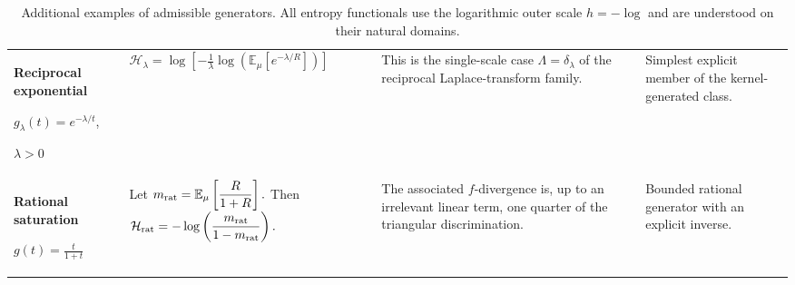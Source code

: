 \documentclass[reqno]{amsart}
\begin{document}
\begin{table}[t]
\begin{tabularx}{\textwidth}{
@{}
>{\raggedright\arraybackslash}p{}
>{\raggedright\arraybackslash}p{}
>{\raggedright\arraybackslash}X
>{\raggedright\arraybackslash}p{}
@{}
}
\textbf{Reciprocal exponential}
\par
$\displaystyle
g_\lambda(t)=e^{-\lambda/t}$,
\par
$\lambda>0$
&
$\displaystyle
\mathcal H_\lambda
=
\log\left[
-\frac{1}{\lambda}
\log\left(
\mathbb E_\mu \left[e^{-\lambda/R} \right]
\right)
\right]
$
&
This is the single-scale case
$\Lambda=\delta_\lambda$ of the reciprocal Laplace-transform family.
&
Simplest explicit member of the kernel-generated class.
\\[3pt]

\textbf{Rational saturation}
\par
$\displaystyle
g(t)=\frac{t}{1+t}$
&
Let
$\displaystyle
m_{\rm rat}
=
\mathbb E_\mu
\left[
\frac{R}{1+R}
\right].
$
Then
$\displaystyle
\mathcal H_{\rm rat}
=
-\log\left(
\frac{m_{\rm rat}}{1-m_{\rm rat}}
\right).
$
&
The associated $f$-divergence is, up to an irrelevant linear term,
one quarter of the triangular discrimination.
&
Bounded rational generator with an explicit inverse.
\\

\bottomrule
\end{tabularx}
\caption{
Additional examples of admissible generators. All entropy functionals use the
logarithmic outer scale $h=-\log$ and are understood on their natural
domains.
}
\label{tab:additional-generators}
\end{table}
\end{document}
